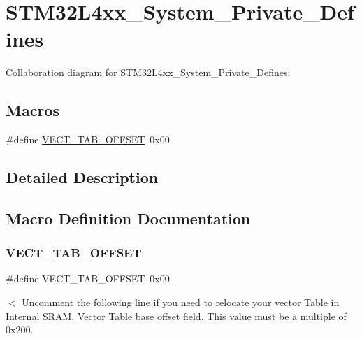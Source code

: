 \hypertarget{group__STM32L4xx__System__Private__Defines}{}\section{S\+T\+M32\+L4xx\+\_\+\+System\+\_\+\+Private\+\_\+\+Defines}
\label{group__STM32L4xx__System__Private__Defines}
Collaboration diagram for S\+T\+M32\+L4xx\+\_\+\+System\+\_\+\+Private\+\_\+\+Defines\+:
\subsection*{Macros}
\begin{DoxyCompactItemize}
\item 
\#define \hyperlink{group__STM32L4xx__System__Private__Defines_ga40e1495541cbb4acbe3f1819bd87a9fe}{V\+E\+C\+T\+\_\+\+T\+A\+B\+\_\+\+O\+F\+F\+S\+ET}~0x00
\end{DoxyCompactItemize}


\subsection{Detailed Description}


\subsection{Macro Definition Documentation}
\mbox{\label{group__STM32L4xx__System__Private__Defines_ga40e1495541cbb4acbe3f1819bd87a9fe}} 
\subsubsection{\texorpdfstring{V\+E\+C\+T\+\_\+\+T\+A\+B\+\_\+\+O\+F\+F\+S\+ET}{VECT\_TAB\_OFFSET}}
{\footnotesize\ttfamily \#define V\+E\+C\+T\+\_\+\+T\+A\+B\+\_\+\+O\+F\+F\+S\+ET~0x00}

$<$ Uncomment the following line if you need to relocate your vector Table in Internal S\+R\+AM. Vector Table base offset field. This value must be a multiple of 0x200. 